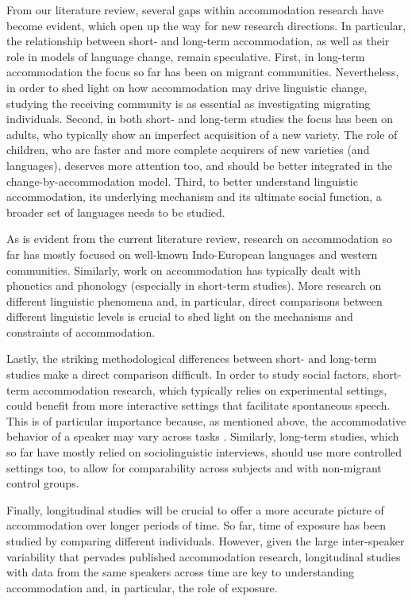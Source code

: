 \documentclass[output=paper]{langscibook}
\begin{document}
From our literature review, several gaps within accommodation research have become evident, which open up the way for new research directions. In particular, the relationship between short- and long-term accommodation, as well as their role in models of language change, remain speculative. First, in long-term accommodation the focus so far has been on migrant communities. Nevertheless, in order to shed light on how accommodation may drive linguistic change, studying the receiving community is as essential as investigating migrating individuals. Second, in both short- and long-term studies the focus has been on adults, who typically show an imperfect acquisition of a new variety. The role of children, who are faster and more complete acquirers of new varieties (and languages), deserves more attention too, and should be better integrated in the change-by-accommodation model. Third, to better understand linguistic accommodation, its underlying mechanism and its ultimate social function, a broader set of languages needs to be studied.

As is evident from the current literature review, research on accommodation so far has mostly focused on well-known Indo-European languages and western communities. Similarly, work on accommodation has typically dealt with phonetics and phonology (especially in short-term studies). More research on different linguistic phenomena and, in particular, direct comparisons between different linguistic levels is crucial to shed light on the mechanisms and constraints of accommodation.

\begin{sloppypar}
Lastly, the striking methodological differences between short- and long-term studies make a direct comparison difficult. In order to study social factors, short-term accommodation research, which typically relies on experimental settings, could benefit from more interactive settings that facilitate spontaneous speech. This is of particular importance because, as mentioned above, the accommodative behavior of a speaker may vary across tasks \citep{pardo_comparison_2018}. Similarly, long-term studies, which so far have mostly relied on sociolinguistic interviews, should use more controlled settings too, to allow for comparability across subjects and  with non-migrant control groups.
\end{sloppypar}

Finally, longitudinal studies will be crucial to offer a more accurate picture of accommodation over longer periods of time. So far, time of exposure has been studied by comparing different individuals. However, given the large inter-speaker variability that pervades published accommodation research, longitudinal studies with data from the same speakers across time are key to understanding accommodation and, in particular, the role of exposure.



\printbibliography[heading=subbibliography,notkeyword=this]
\end{document}
